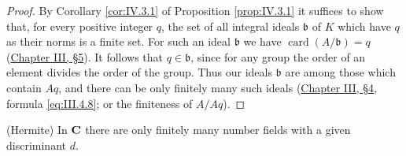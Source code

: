 \begin{proof}
By Corollary \ref{cor:IV.3.1} of Proposition \ref{prop:IV.3.1} it suffices
to show that, for every positive integer $q$, the set of all integral ideals
$\mathfrak{b}$ of $K$ which have $q$ as their norms is a finite set. For
such an ideal $\mathfrak{b}$ we have
$\operatorname{card}(A/\mathfrak{b})=q$ (\hyperref[sec:3.5]{Chapter III, §5}). It follows that
$q\in\mathfrak{b}$, since for any group the order of an element divides the
order of the group. Thus our ideals $\mathfrak{b}$ are among those which
contain $Aq$, and there can be only finitely many such ideals (\hyperref[sec:3.4]{Chapter III,
§4}, formula \eqref{eq:III.4.8}; or the finiteness of $A/Aq$).
\end{proof}

\begin{theorem}
\label{thm:IV.3.3}
\textnormal{(Hermite)} In $\mathbf{C}$ there are only finitely many number fields
with a given discriminant $d$.
\end{theorem}

